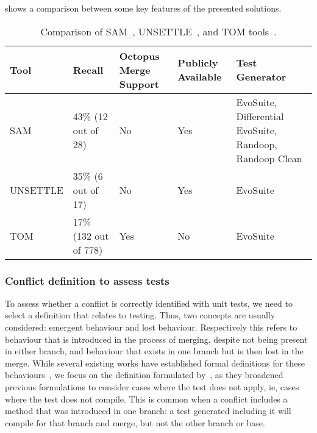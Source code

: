  shows a comparison between some key features of the presented solutions.


\begin{table}[t]
\setlength\extrarowheight{2pt}
\begin{tabularx}{\textwidth}{p{}p{}p{}p{}p{}}
  \toprule
  \textbf{Tool} & \textbf{Recall} & \textbf{Octopus Merge Support} & \textbf{Publicly Available} & \textbf{Test Generator} \\
  \midrule
  SAM & 43\% \newline (12 out of 28) & No & Yes & EvoSuite, Differential EvoSuite, Randoop, Randoop Clean \\ \hline
  UNSETTLE & 35\% \newline (6 out of 17) & No & Yes & EvoSuite \\ \hline
  TOM & 17\% \newline (132 out of 778) & Yes & No & EvoSuite \\
 \bottomrule
\end{tabularx}
\caption{\label{table:tool-comparison}Comparison of SAM~\cite{kn:leuson2}, UNSETTLE~\cite{kn:nuno}, and TOM tools~\cite{kn:ji2022}.}
\end{table}



\subsubsection{Conflict definition to assess tests}\label{chap:rw:behaviours}

To assess whether a conflict is correctly identified with unit tests, we need to select a definition that relates to testing.
Thus, two concepts are usually considered: emergent behaviour and lost behaviour. Respectively this refers to behaviour that 
is introduced in the process of merging, despite not being present in either branch, and behaviour that exists in one branch
but is then lost in the merge. While several existing works have established formal definitions for these behaviours~\cite{kn:taoji,kn:leuson},
we focus on the definition formulated by~\citet{kn:nuno}, as they broadened previous formulations to consider cases where the test does not apply,
ie, cases where the test does not compile. This is common when a conflict includes a method that was introduced in one branch: a test generated including
it will compile for that branch and merge, but not the other branch or base.

